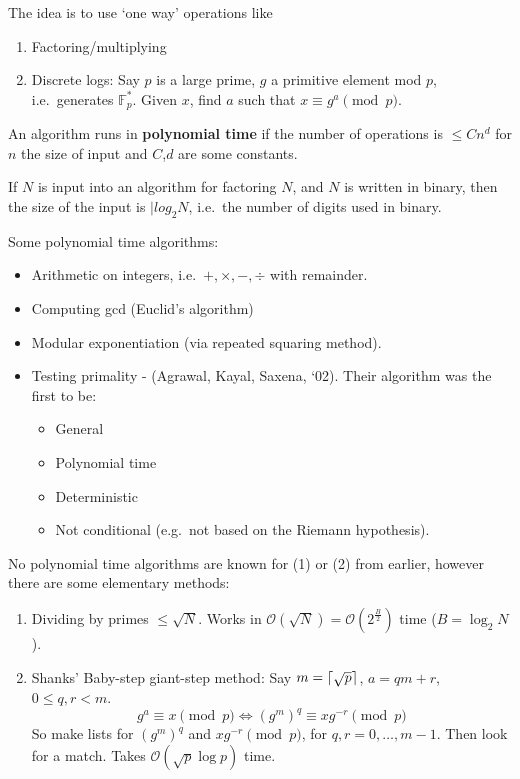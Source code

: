 \documentclass{article}
\DeclarePairedDelimiter{\ceil}{\lceil}{\rceil}
\newcommand{\F}{\mathbb{F}}
\newcommand{\1}[1]{\mathbbm{1}_{#1}}
\begin{document}
The idea is to use `one way' operations like
\begin{enumerate}[label=(\arabic*)]
    \item Factoring/multiplying
    \item Discrete logs: Say $p$ is a large prime, $g$ a primitive element mod $p$, i.e.\ generates $\F_p^*$. Given $x$, find $a$ such that $x \equiv g^a \pmod{p}$.
\end{enumerate}
\begin{defi}
    An algorithm runs in \textbf{polynomial time} if the number of operations is $\leq C n^d$ for $n$ the size of input and $C$,$d$ are some constants.
\end{defi}
\begin{eg}
    If $N$ is input into an algorithm for factoring $N$, and $N$ is written in binary, then the size of the input is $|log_2N$, i.e.\ the number of digits used in binary.

    Some polynomial time algorithms:
    \begin{itemize}
        \item Arithmetic on integers, i.e.\ $+, \times, -, \div$ with remainder.
        \item Computing gcd (Euclid's algorithm)
        \item Modular exponentiation (via repeated squaring method).
        \item Testing primality - (Agrawal, Kayal, Saxena, `02). Their algorithm was the first to be:
            \begin{itemize}
                \item General
                \item Polynomial time
                \item Deterministic
                \item Not conditional (e.g.\ not based on the Riemann hypothesis).
            \end{itemize}
    \end{itemize}
    No polynomial time algorithms are known for (1) or (2) from earlier, however there are some elementary methods:
    \begin{enumerate}[label=(\arabic*)]
        \item Dividing by primes $\leq \sqrt{N}$. Works in $\mathcal{O}(\sqrt{N}) = \mathcal{O}(2^{\frac{B}{2}})$ time ($B = \log_2 N$).
        \item Shanks' Baby-step giant-step method: Say $m = \ceil{\sqrt{p}}$, $a = qm + r$, $0 \leq q , r < m$.
            \begin{equation*}
                g^a \equiv x \pmod{p} \iff (g^m)^q \equiv x g^{-r} \pmod{p}
            \end{equation*}
            So make lists for $(g^m)^q$ and $x g^{-r} \pmod{p}$, for $q,r=0, \dotsc, m-1$. Then look for a match.
            Takes $\mathcal{O}(\sqrt{p} \log p)$ time.
    \end{enumerate}
\end{eg}
\end{document}
